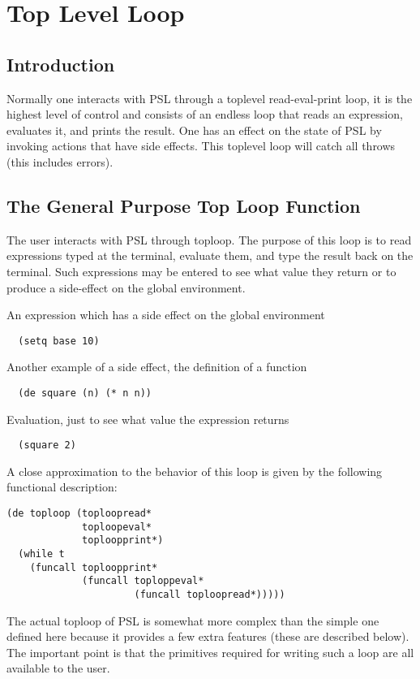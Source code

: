 \chapter{Top Level Loop}


\section{Introduction}

  Normally   one   interacts   with   PSL   through  a  toplevel
read-eval-print loop, it is the highest  level  of  control  and
consists  of an endless loop that reads an expression, evaluates
it, and prints the result.  One has an effect on  the  state  of
PSL  by  invoking actions that have side effects.  This toplevel
loop will catch all throws (this includes errors).

\section{The General Purpose Top Loop Function}

  The user interacts with PSL through toploop.  The  purpose  of
this loop is to read expressions typed at the terminal, evaluate
them,   and  type  the  result  back  on  the  terminal.    Such
expressions may be entered to see what value they return  or  to
produce a side-effect on the global environment.

An expression which has a side effect on the global environment
\begin{verbatim}
  (setq base 10)
\end{verbatim}
Another example of a side effect, the definition of a function
\begin{verbatim}
  (de square (n) (* n n))
\end{verbatim}
Evaluation, just to see what value the expression returns
\begin{verbatim}
  (square 2)
\end{verbatim}
A  close  approximation to the behavior of this loop is given by
the following functional description:

\begin{verbatim}
(de toploop (toploopread*
             toploopeval*
             toploopprint*)
  (while t
    (funcall toploopprint*
             (funcall toploppeval*
                      (funcall toploopread*)))))
\end{verbatim}
The actual toploop of PSL is  somewhat  more  complex  than  the
simple one defined here because it provides a few extra features
(these  are  described  below).  The important point is that the
primitives required for writing such a loop are all available to
the user.

